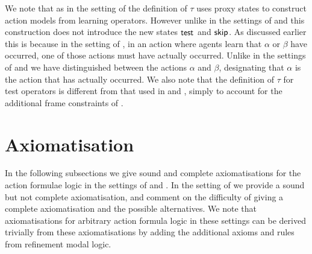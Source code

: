 We note that as in the setting of \classKFF{} the definition of $\tau$ uses proxy states to construct action models from learning operators.
However unlike in the settings of \classK{} and \classKFF{} this construction does not introduce the new states $\aStateTest$ and $\aStateSkip$.
As discussed earlier this is because in the setting of \classS{}, in an action where agents learn that $\alpha$ or $\beta$ have occurred, one of those actions must have actually occurred.
Unlike in the settings of \classK{} and \classKFF{} we have distinguished between the actions $\alpha$ and $\beta$, designating that $\alpha$ is the action that has actually occurred.
We also note that the definition of $\tau$ for test operators is different from that used in \classK{} and \classKFF{}, simply to account for the additional frame constraints of \classS{}.

\section{Axiomatisation}\label{aafl-axiomatisation}

In the following subsections we give sound and complete axiomatisations for the action formulae logic in the settings of \classK{} and \classKFF{}.
In the setting of \classS{} we provide a sound but not complete axiomatisation, and comment on the difficulty of giving a complete axiomatisation and the possible alternatives.
We note that axiomatisations for arbitrary action formula logic in these settings can be derived trivially from these axiomatisations by adding the additional axioms and rules from refinement modal logic.

\subsection{\classK{}}

